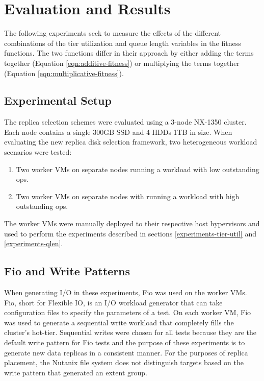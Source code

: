\documentclass[12pt]{article}
\begin{document}
\newpage
\FloatBarrier
\section{Evaluation and Results}

The following experiments seek to measure the effects of the different
combinations of the tier utilization and queue length variables in the fitness
functions. The two functions differ in their approach by either adding the
terms together (Equation \ref{eqn:additive-fitness}) or multiplying the terms
together (Equation \ref{eqn:multiplicative-fitness}).

  \subsection{Experimental Setup}

  The replica selection schemes were evaluated using a 3-node NX-1350 cluster.
  Each node contains a single 300GB SSD and 4 HDDs 1TB in size. When evaluating
  the new replica disk selection framework, two heterogeneous workload
  scenarios were tested:
 
  \begin{tcolorbox}
  \begin{enumerate}
    \item Two worker VMs on separate nodes running a workload with low
          outstanding ops.
    \item Two worker VMs on separate nodes with running a
          workload with high outstanding ops.
  \end{enumerate}
  \end{tcolorbox}

  The worker VMs were manually deployed to their respective host hypervisors and
  used to perform the experiments described in sections
  \ref{experiments-tier-util} and \ref{experiments-qlen}.
 
  \subsection{Fio and Write Patterns}

  When generating I/O in these experiments, Fio was used on the worker VMs. Fio,
  short for Flexible IO, is an I/O workload generator that can take
  configuration files to specify the parameters of a test. On each worker VM,
  Fio was used to generate a sequential write workload that completely fills the
  cluster's hot-tier. Sequential writes were chosen for all tests because they
  are the default write pattern for Fio tests and the purpose of these
  experiments is to generate new data replicas in a consistent manner. For the
  purposes of replica placement, the Nutanix file system does not distinguish
  targets based on the write pattern that generated an extent group.
\end{document}
